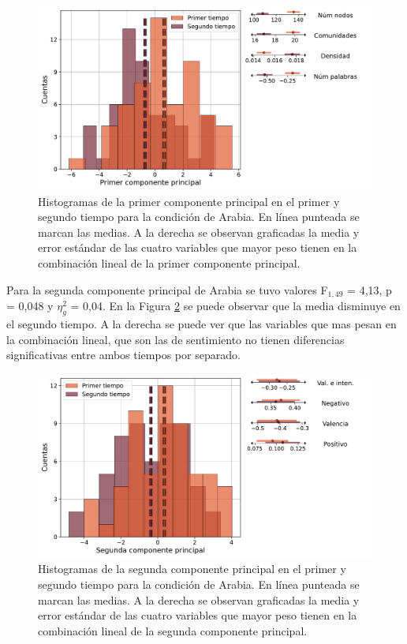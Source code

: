 \begin{figure}[h]
    \centering
    \includegraphics[width = 14cm]{figures/ch03/DosTiempos/arabia_PC1.pdf} 
    \caption{Histogramas de la primer componente principal en el primer y segundo tiempo para la condición de Arabia. En línea punteada se marcan las medias. A la derecha se observan graficadas la media y error estándar de las cuatro variables que mayor peso tienen en la combinación lineal de la primer componente principal.}
\label{fig:cap3_ArPC1}
\end{figure}

Para la segunda componente principal de Arabia se tuvo valores F$_{1,49}$ = 4,13, p = 0,048 y $\eta_g^2$ = 0,04. En la Figura \ref{fig:cap3_ArPC2} se puede observar que la media disminuye en el segundo tiempo. A la derecha se puede ver que las variables que mas pesan en la combinación lineal, que son las de sentimiento no tienen diferencias significativas entre ambos tiempos por separado. 

\begin{figure}[h]
    \centering
    \includegraphics[width = 14cm]{figures/ch03/DosTiempos/arabia_PC2.pdf} 
    \caption{Histogramas de la segunda componente principal en el primer y segundo tiempo para la condición de Arabia. En línea punteada se marcan las medias. A la derecha se observan graficadas la media y error estándar de las cuatro variables que mayor peso tienen en la combinación lineal de la segunda componente principal.}
\label{fig:cap3_ArPC2}
\end{figure}

